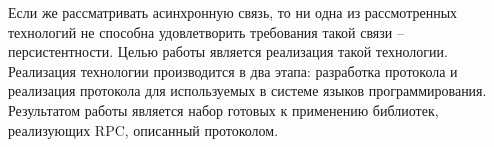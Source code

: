 Если же рассматривать асинхронную связь, то ни одна из рассмотренных технологий
не способна удовлетворить требования такой связи -- персистентности.
Целью работы является реализация такой технологии. Реализация технологии
производится в два этапа: разработка протокола и реализация протокола
для используемых в системе языков программирования. Результатом работы
является набор готовых к применению библиотек, реализующих RPC, описанный
протоколом.
